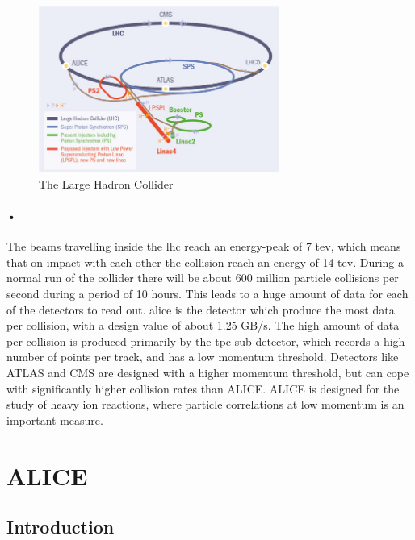 \documentclass[a4paper]{report}
\begin{document}
\begin{figure}[h!]
  \centering
    \includegraphics[width=0.7\textwidth]{images/lhc-ring.jpg}
     \caption{The Large Hadron Collider}
    \label{fig:lhc}
\end{figure}

\paragraph{•}
The beams travelling inside the \gls{lhc} reach an energy-peak of 7 \gls{tev}, which means that on impact with each other the collision reach an energy of 14 \gls{tev}.\cite{lhc-pdf}
During a normal run of the collider there will be about 600 million particle collisions per second during a period of 10 hours.
This leads to a huge amount of data for each of the detectors to read out. 
\gls{alice} is the detector which produce the most data per collision, with a design value of about 1.25 GB/s.
The high amount of data per collision is produced primarily by the \gls{tpc} sub-detector, which records a high number of points per track, and has a low momentum threshold. Detectors like ATLAS and CMS  are designed with a higher momentum threshold, but can cope with significantly higher collision rates than ALICE. ALICE is designed for the study of heavy ion reactions, where particle correlations at low momentum is an important measure.

\section{ALICE}
\subsection{Introduction}
\end{document}
